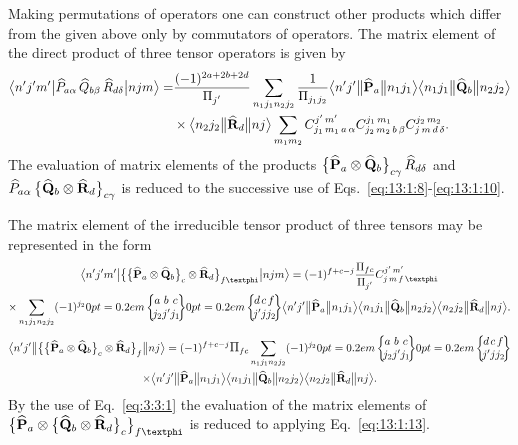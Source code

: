 Making permutations of operators one can construct other products which differ from the given above only by commutators of operators. The matrix element of the direct product of three tensor operators is given by
\begin{align}
\braOket{n^{\prime} j^{\prime} m^{\prime}}{\widehat{P}_{a \alpha} \, \widehat{Q}_{b \beta} \, \widehat{R}_{d \delta}}{n j m}
=&\frac{(-1)^{2 a+2 b+2 d}}{\Fact{j^{\prime}}} \sum_{n_{1} j_{1} n_{2} j_{2}} \frac{1}{\Fact{j_{1} j_{2}}}
\braOketred{n^\prime j^{\prime}}{\widehat{\mathbf{P}}_{a}}{n_{1} j_{1}}
\braOketred{n_{1} j_{1}}{\widehat{\mathbf{Q}}_{b}}{n_2 j_2}\notag\\
&\times
\braOketred{n_{2} j_{2}}{\widehat{\mathbf{R}}_{d}}{n j}
\sum_{m_{1} m_{2}} 
\clebsch{j_{1}}{m_{1}}{a}{\alpha}{j^{\prime}}{m^{\prime}} 
\clebsch{j_{2}}{m_{2}}{b}{\beta}{j_{1}}{m_{1}} 
\clebsch{j}{m}{d}{\delta}{j_{2}}{m_{2}}. \label{eq:13:1:12}
\end{align}
The evaluation of matrix elements of the products \(\bigl\{\widehat{\mathbf{P}}_{a} \otimes \widehat{\mathbf{Q}}_{b}\bigr\}_{c \gamma} \, \widehat{R}_{d \delta}\) and \(\widehat{P}_{a \alpha} \,\bigl\{\widehat{\mathbf{Q}}_{b} \otimes \widehat{\mathbf{R}}_{d}\bigr\}_{c \gamma}\) is reduced to the successive use of Eqs.~\eqref{eq:13:1:8}-\eqref{eq:13:1:10}.

The matrix element of the irreducible tensor product of three tensors may be represented in the form
\begin{multline}
\braOket{n^{\prime} j^{\prime} m^{\prime}}{\bigl\{\bigl\{\widehat{\vect{P}}_{a} \otimes \widehat{\vect{Q}}_{b}\bigr\}_{c} \otimes \widehat{\vect{R}}_{d}\bigr\}_{f \varphi}}{n j m}
=(-1)^{f+c-j} \frac{\Fact{f c}}{\Fact{j^{\prime}}} 
\clebsch{j}{m}{f}{\varphi}{j^{\prime}}{m^{\prime}} \\
\times \sum_{n_{1} j_{1} n_{2} j_{2}}(-1)^{j_{2}}
\sixj{a}{b}{c}{j_{2}}{j^{\prime}}{j_{1}}
\sixj{d}{c}{f}{j^{\prime}}{j}{j_{2}}
\braOketred{ n^{\prime} j^{\prime}}{\widehat{\vect{P}}_{a}}{ n_{1} j_{1}}
\braOketred{ n_{1} j_{1}}{\widehat{\vect{Q}}_{b}}{ n_{2} j_{2}}
\braOketred{ n_{2} j_{2}}{\widehat{\vect{R}}_{d}}{ n j}. \label{eq:13:1:13}
\end{multline}
\begin{multline*}
\braOketred{n^{\prime} j^{\prime}}{\bigl\{\bigl\{\widehat{\vect{P}}_{a} \otimes \widehat{\vect{Q}}_{b}\bigr\}_{c} \otimes \widehat{\vect{R}}_{d}\bigr\}_{f}}{n j}
=(-1)^{f+c-j} \Fact{f c} \sum_{n_{1} j_{1} n_{2} j_{2}}(-1)^{j_{2}}
\sixj{a}{b}{c}{j_{2}}{j^{\prime}}{j_{1}}
\sixj{d}{c}{f}{j^{\prime}}{j}{j_{2}} \\
\times
\braOketred{ n^{\prime} j^{\prime}}{\widehat{\vect{P}}_{a}}{ n_{1} j_{1}}
\braOketred{ n_{1} j_{1}}{\widehat{\vect{Q}}_{b}}{ n_{2} j_{2}}
\braOketred{ n_{2} j_{2}}{\widehat{\vect{R}}_{d}}{ n j}.
\end{multline*}
By the use of Eq.~\eqref{eq:3:3:1} the evaluation of the matrix elements of \(\bigl\{\widehat{\vect{P}}_{a} \otimes\bigl\{\widehat{\vect{Q}}_{b} \otimes \widehat{\vect{R}}_{d}\bigr\}_{c}\bigr\}_{f \varphi}\) is reduced to applying Eq.~\eqref{eq:13:1:13}.

